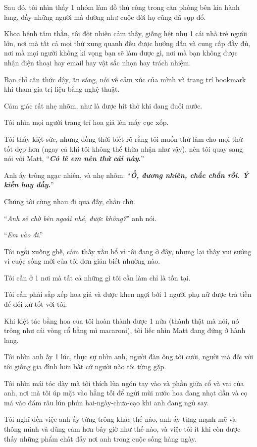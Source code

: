 \documentclass{book}
\numberwithin{equation}{section}
\begin{document}
Sau đó, tôi nhìn thấy 1 nhóm làm đồ thủ công trong căn phòng bên kia hành lang, đầy những người mà dường như cuộc đời họ cũng đã sụp đổ.

%
Khoa bệnh tâm thần, tôi đột nhiên cảm thấy, giống hệt như 1 cái nhà trẻ người lớn, nơi mà tất cả mọi thứ xung quanh đều được hướng dẫn và cung cấp đầy đủ, nơi mà mọi người không kì vọng bạn sẽ làm được gì, nơi mà bạn không được nhận điện thoại hay email hay vật sắc nhọn hay trách nhiệm.

Bạn chỉ cần thức dậy, ăn sáng, nói về cảm xúc của mình và trang trí bookmark khi tham gia trị liệu bằng nghệ thuật.

Cảm giác rất nhẹ nhõm, như là được hít thở khi đang đuối nước.

Tôi nhìn mọi người trang trí hoa giả lên mấy cục xốp.

Tôi thấy kiệt sức, nhưng đồng thời biết rõ rằng tôi muốn thử làm cho mọi thứ tốt đẹp hơn (ngay cả khi tôi không thể thừa nhận như vậy), nên tôi quay sang nói với Matt, ``\textbf{\textit{Có lẽ em nên thử cái này}.}''

Anh ấy trông ngạc nhiên, và nhẹ nhõm: ``\textbf{\textit{Ồ, đương nhiên, chắc chắn rồi. Ý kiến hay đấy}.}''

%
Chúng tôi cùng nhau đi qua đấy, chần chừ.

``\textit{Anh sẽ chờ bên ngoài nhé, được không?}'' anh nói.

``\textit{Em vào đi}.''

Tôi ngồi xuống ghế, cảm thấy xấu hổ vì tôi đang ở đây, nhưng lại thấy vui sướng vì cuộc sống mới của tôi đơn giản biết nhường nào.

Tôi cần ở 1 nơi mà tất cả những gì tôi cần làm chỉ là tồn tại.

Tôi cần phải sắp xếp hoa giả và được khen ngợi bởi 1 người phụ nữ được trả tiền để đối xử tốt với tôi.

Khi kiệt tác bằng hoa của tôi hoàn thành được 1 nửa (thành thật mà nói, nó trông như cái vòng cổ bằng mì macaroni), tôi liếc nhìn Matt đang đứng ở hành lang.

Tôi nhìn anh ấy 1 lúc, thực sự nhìn anh, người đàn ông tôi cưới, người mà đối với tôi giống gia đình hơn bất cứ người nào tôi từng gặp.

%
Tôi nhìn mái tóc dày mà tôi thích lùa ngón tay vào và phần giữa cổ và vai của anh, nơi mà tôi úp mặt vào hằng tối để ngửi mùi nước hoa đang nhạt dần và cọ má vào đám râu lún phún hai-ngày-chưa-cạo khi anh đang ngủ say.

Tôi nghĩ đến việc anh ấy từng trông khác thế nào, anh ấy từng mạnh mẽ và thông minh và dũng cảm hơn bây giờ như thế nào, và việc tôi ít khi còn được thấy những phẩm chất đấy nơi anh trong cuộc sống hàng ngày.
\end{document}
